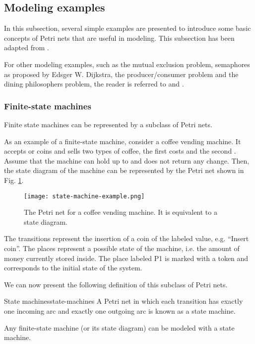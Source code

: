 \subsection{Modeling examples}

In this subsection, several simple examples are presented to introduce
some basic concepts of Petri nets that are useful in modeling.
This subsection has been adapted from \cite{murata1989}.

For other modeling examples, such as the mutual exclusion problem,
semaphores as proposed by Edsger W. Dijkstra, the producer/consumer problem
and the dining philosophers problem, the reader is referred to
\cite[Chapter 3]{peterson1981} and \cite{reisig2013}.

\subsubsection{Finite-state machines}

Finite state machines can be represented by a subclass of Petri nets.

As an example of a finite-state machine, consider a coffee vending machine.
It accepts  or  coins and sells two types of coffee, the first costs  and the second .
Assume that the machine can hold up to  and does not return any change.
Then, the state diagram of the machine can be represented
by the Petri net shown in Fig. \ref{fig:state-machine-example}.

\begin{figure}[H]
    \centering
    \texttt{[image: state-machine-example.png]}
    \caption{The Petri net for a coffee vending machine. It is equivalent to a state diagram.}
    \label{fig:state-machine-example}
\end{figure}

The transitions represent the insertion of a coin of the labeled value, e.g. ``Insert  coin''.
The places represent a possible state of the machine, i.e. the amount of money currently stored inside.
The place labeled \uppercase{P1} is marked with a token and corresponds to the initial state of the system.

We can now present the following definition of this subclass of Petri nets.

\begin{definition}{State machines}{state-machines}
    A Petri net in which each transition has exactly one incoming arc
    and exactly one outgoing arc is known as a state machine.

    Any finite-state machine (or its state diagram) can be modeled with a state machine.
\end{definition}

